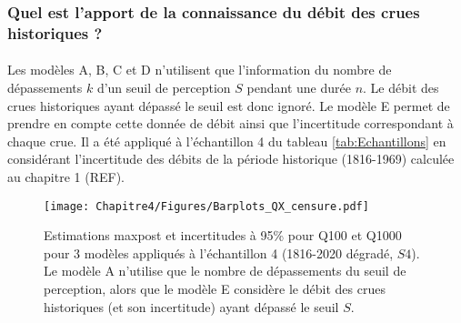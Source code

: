 \FloatBarrier

	\subsubsection{Quel est l'apport de la connaissance du débit des crues historiques ?}

	\paragraph{} Les modèles A, B, C et D n'utilisent que l'information du nombre de dépassements $k$ d'un seuil de perception $S$ pendant une durée $n$. Le débit des crues historiques ayant dépassé le seuil est donc ignoré. Le modèle E permet de prendre en compte cette donnée de débit ainsi que l'incertitude correspondant à chaque crue. Il a été appliqué à l'échantillon 4 du tableau \ref{tab:Echantillons} en considérant l'incertitude des débits de la période historique (1816-1969) calculée au chapitre 1 (REF).
	
	
	\begin{figure}[h]
		\centering
		\texttt{[image: Chapitre4/Figures/Barplots\_QX\_censure.pdf]}
		\caption{Estimations maxpost et incertitudes à 95\% pour Q100 et Q1000 pour 3 modèles appliqués à l'échantillon 4 (1816-2020 dégradé, $S4$). Le modèle A n'utilise que le nombre de dépassements du seuil de perception, alors que le modèle E considère le débit des crues historiques (et son incertitude) ayant dépassé le seuil $S$.}
		\label{fig:CensureArtif}
	\end{figure}
	
%		
%	
